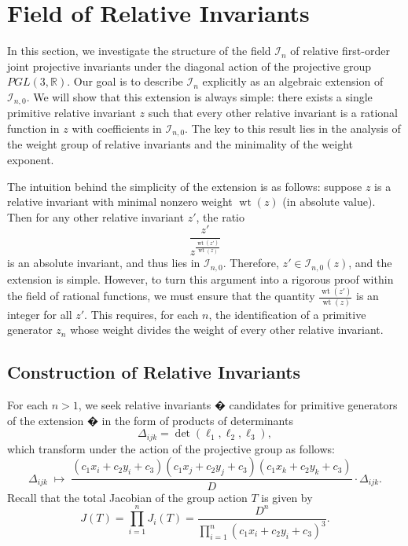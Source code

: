 \documentclass[12pt,reqno]{amsart}
\begin{document}
\section{Field of Relative Invariants}

In this section, we investigate the structure of the field $\mathcal{I}_n$ of relative first-order joint projective invariants under the diagonal action of the projective group $PGL(3, \mathbb{R})$. Our goal is to describe $\mathcal{I}_n$ explicitly as an algebraic extension of $\mathcal{I}_{n,0}$. We will show that this extension is always simple: there exists a single primitive relative invariant $z$ such that every other relative invariant is a rational function in $z$ with coefficients in $\mathcal{I}_{n,0}$. The key to this result lies in the analysis of the weight group of relative invariants and the minimality of the weight exponent.

The intuition behind the simplicity of the extension is as follows: suppose $z$ is a relative invariant with minimal nonzero weight $\operatorname{wt}(z)$ (in absolute value). Then for any other relative invariant $z'$, the ratio
\[
\frac{z'}{z^{\frac{\operatorname{wt}(z')}{\operatorname{wt}(z)}}}
\]
is an absolute invariant, and thus lies in $\mathcal{I}_{n,0}$. Therefore, $z' \in \mathcal{I}_{n,0}(z)$, and the extension is simple. However, to turn this argument into a rigorous proof within the field of rational functions, we must ensure that the quantity $\frac{\operatorname{wt}(z')}{\operatorname{wt}(z)}$ is an integer for all $z'$. This requires, for each $n$, the identification of a primitive generator $z_n$ whose weight divides the weight of every other relative invariant. 

\subsection{Construction of Relative Invariants}

For each \( n > 1 \), we seek relative invariants � candidates for primitive generators of the extension � in the form of products of determinants
\[
\Delta_{ijk}=\det(\ell_1, \ell_2, \ell_3),
\]
which transform under the action of the projective group as follows:
\[
\Delta_{ijk} \;\longmapsto\; \frac{(c_1x_i + c_2y_i + c_3)
(c_1x_j + c_2y_j + c_3)(c_1x_k + c_2y_k + c_3)}{D}
\cdot \Delta_{ijk}.
\]
Recall that the total Jacobian of the group action \( T \) is given by
\[
J(T) = \prod_{i=1}^n J_i(T) = \frac{D^n}{\displaystyle\prod_{i=1}^n
(c_1x_i + c_2y_i + c_3)^3}.
\]
\end{document}
